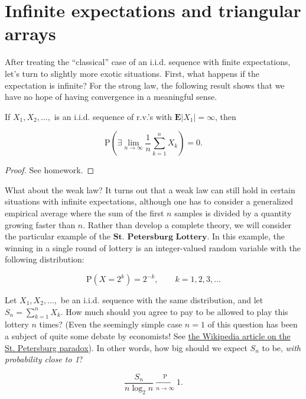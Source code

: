 \section{Infinite expectations and triangular arrays}

After treating the ``classical'' case of an i.i.d.
sequence with finite expectations, let's turn to
slightly more exotic situations. First, what happens
if the expectation is infinite? For the strong law,
the following result shows that we have no hope of
having convergence in a meaningful sense.

\begin{thm}
If $X_1,X_2,\ldots,$ is an i.i.d. sequence of r.v.'s
with $\mathbf{E}|X_1|=\infty$, then

\[
\mathrm{P}\left( \exists \lim_{n\to\infty} \frac{1}{n}\sum_{k=1}^n X_k \right) = 0.
\]

\end{thm}

\begin{proof}
See homework.
\end{proof}

\noindent What about the weak law? It turns out that a weak law
can still hold in certain situations with infinite
expectations, although one has to consider a
generalized empirical average where the sum of the
first $n$ samples is divided by a quantity growing
faster than $n$. Rather than develop a complete
theory, we will consider the particular example of the
$\textbf{St. Petersburg Lottery}$. In this example,
the winning in a single round of lottery is an
integer-valued random variable with the following
distribution:

\[
\mathrm{P}(X=2^k) = 2^{-k}, \qquad k=1,2,3,\ldots
\]

\noindent Let $X_1,X_2,\ldots,$ be an i.i.d. sequence with the
same distribution, and let $S_n = \sum_{k=1}^n X_k$.
How much should you agree to pay to be allowed to play
this lottery $n$ times? (Even the seemingly simple
case $n=1$ of this question  has been a subject of
quite some debate by economists! See \href{http://en.wikipedia.org/wiki/St._Petersburg_paradox}{the Wikipedia
article on the St. Petersburg
paradox}).
In other words, how big should we expect $S_n$ to be,
\emph{with probability close to 1}?

\begin{thm}

\[
\frac{S_n}{n\log_2 n} \xrightarrow[n\to\infty]{\mathrm{P}} 1.
\]

\end{thm}


